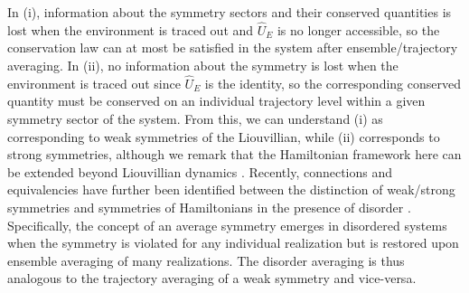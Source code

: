\documentclass[11pt]{article}
\begin{document}
In (i), information about the symmetry sectors and their conserved quantities is lost when the environment is traced out and $\hat U_E$ is no longer accessible, so the conservation law can at most be satisfied in the system after ensemble/trajectory averaging. 
In (ii), no information about the symmetry is lost when the environment is traced out since $\hat U_E$ is the identity, so the corresponding conserved quantity must be conserved on an individual trajectory level within a given symmetry sector of the system. From this, we can understand (i) as corresponding to weak symmetries of the Liouvillian, while (ii) corresponds to strong symmetries, although we remark that the Hamiltonian framework here can be extended beyond Liouvillian dynamics \cite{Manzano2018}. Recently, connections and equivalencies have further been identified between the distinction of weak/strong symmetries and symmetries of Hamiltonians in the presence of disorder \cite{Ma2023a,Ma2023b}. Specifically, the concept of an average symmetry emerges in disordered systems when the symmetry is violated for any individual realization but is restored upon ensemble averaging of many realizations. The disorder averaging is thus analogous to the trajectory averaging of a weak symmetry and vice-versa.
\end{document}
